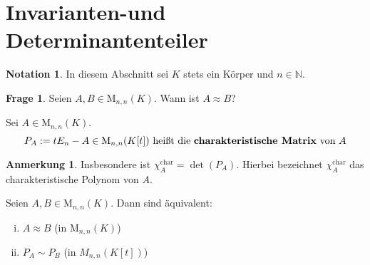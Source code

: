 \documentclass[a4paper, titlepage]{article}
\theoremstyle{definition}
\newtheorem*{anm}{Anmerkung}
\newtheorem*{frage}{Frage}
\newtheorem*{notation}{Notation}
\newcommand{\N}{\mathbb{N}}
\newcommand{\M}{\mathrm{M}}
\begin{document}
\section{Invarianten-und Determinantenteiler}
\begin{notation}
    In diesem Abschnitt sei $K$ stets ein Körper und $n\in\N$.
\end{notation}
\begin{frage}
    Seien $A,B\in\M_{n,n}(K).$ Wann ist $A\approx B$?
\end{frage}
\begin{definition}
    Sei $A\in\M_{n,n}(K)$. 
    $$P_A:=tE_n-A\in\M_{n,n}(K[t]) \text{ heißt die \textbf{charakteristische Matrix} von }A$$
\end{definition}
\begin{anm}
    Insbesondere ist $\chi_{A}^{\text{char}}=\det(P_A).$ Hierbei bezeichnet $\chi_{A}^{\text{char}}$ das charakteristische Polynom von $A$.
\end{anm}
\begin{satz}
    Seien $A,B\in\M_{n,n}(K)$. Dann sind äquivalent:
    \begin{enumerate}[(i)]
        \item $A\approx B$ (in $\M_{n,n}(K)$) 
        \item $P_A\sim P_B$ (in $M_{n,n}(K[t])$)
    \end{enumerate}
\end{satz}
\end{document}
